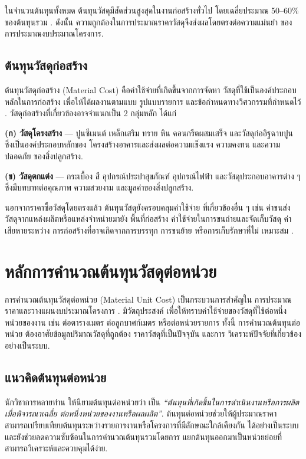 ในจำนวนต้นทุนทั้งหมด ต้นทุนวัสดุมีสัดส่วนสูงสุดในงานก่อสร้างทั่วไป
โดยเฉลี่ยประมาณ 50--60\% ของต้นทุนรวม \cite{ashworth2015,elmohr2022}.
ดังนั้น ความถูกต้องในการประมาณราคาวัสดุจึงส่งผลโดยตรงต่อความแม่นยำ
ของการประมาณงบประมาณโครงการ.

\subsection{ต้นทุนวัสดุก่อสร้าง}

ต้นทุนวัสดุก่อสร้าง (Material Cost) คือค่าใช้จ่ายที่เกิดขึ้นจากการจัดหา
วัสดุที่ใช้เป็นองค์ประกอบหลักในการก่อสร้าง เพื่อให้ได้ผลงานตามแบบ
รูปแบบรายการ และข้อกำหนดทางวิศวกรรมที่กำหนดไว้ \cite{ashworth2013}.
วัสดุก่อสร้างที่เกี่ยวข้องอาจจำแนกเป็น 2 กลุ่มหลัก ได้แก่

\textbf{(ก) วัสดุโครงสร้าง} --- ปูนซีเมนต์ เหล็กเสริม ทราย หิน
คอนกรีตผสมเสร็จ และวัสดุก่ออิฐฉาบปูน ซึ่งเป็นองค์ประกอบหลักของ
โครงสร้างอาคารและส่งผลต่อความแข็งแรง ความคงทน และความปลอดภัย
ของสิ่งปลูกสร้าง.

\textbf{(ข) วัสดุตกแต่ง} --- กระเบื้อง สี อุปกรณ์ประปาสุขภัณฑ์
อุปกรณ์ไฟฟ้า และวัสดุประกอบอาคารต่าง ๆ ซึ่งมีบทบาทต่อคุณภาพ
ความสวยงาม และมูลค่าของสิ่งปลูกสร้าง.

นอกจากราคาซื้อวัสดุโดยตรงแล้ว ต้นทุนวัสดุยังครอบคลุมค่าใช้จ่าย
ที่เกี่ยวข้องอื่น ๆ เช่น ค่าขนส่งวัสดุจากแหล่งผลิตหรือแหล่งจำหน่ายมายัง
พื้นที่ก่อสร้าง ค่าใช้จ่ายในการขนถ่ายและจัดเก็บวัสดุ ค่าเสียหายระหว่าง
การก่อสร้างที่อาจเกิดจากการบรรทุก การขนย้าย หรือการเก็บรักษาที่ไม่
เหมาะสม \cite{benchanakatkun2014}.

\section{หลักการคำนวณต้นทุนวัสดุต่อหน่วย}
\label{sec:unit-cost-theory}

การคำนวณต้นทุนวัสดุต่อหน่วย (Material Unit Cost) เป็นกระบวนการสำคัญใน
การประมาณราคาและวางแผนงบประมาณโครงการ \cite{ashworth2015}. มีวัตถุประสงค์
เพื่อให้ทราบค่าใช้จ่ายของวัสดุที่ใช้ต่อหนึ่งหน่วยของงาน เช่น ต่อตารางเมตร
ต่อลูกบาศก์เมตร หรือต่อหน่วยรายการ ทั้งนี้ การคำนวณต้นทุนต่อหน่วย
ต้องอาศัยข้อมูลปริมาณวัสดุที่ถูกต้อง ราคาวัสดุที่เป็นปัจจุบัน และการ
วิเคราะห์ปัจจัยที่เกี่ยวข้องอย่างเป็นระบบ.

\subsection{แนวคิดต้นทุนต่อหน่วย}

นักวิชาการหลายท่าน \cite{ashworth2015,crone1992} ให้นิยามต้นทุนต่อหน่วยว่า
เป็น \emph{``ต้นทุนที่เกิดขึ้นในการดำเนินงานหรือการผลิตเมื่อพิจารณาเฉลี่ย
ต่อหนึ่งหน่วยของงานหรือผลผลิต''}. ต้นทุนต่อหน่วยช่วยให้ผู้ประมาณราคา
สามารถเปรียบเทียบต้นทุนระหว่างรายการงานหรือโครงการที่มีลักษณะใกล้เคียงกัน
ได้อย่างเป็นระบบ และยังช่วยลดความซับซ้อนในการคำนวณต้นทุนรวมโดยการ
แยกต้นทุนออกมาเป็นหน่วยย่อยที่สามารถวิเคราะห์และควบคุมได้ง่าย.

